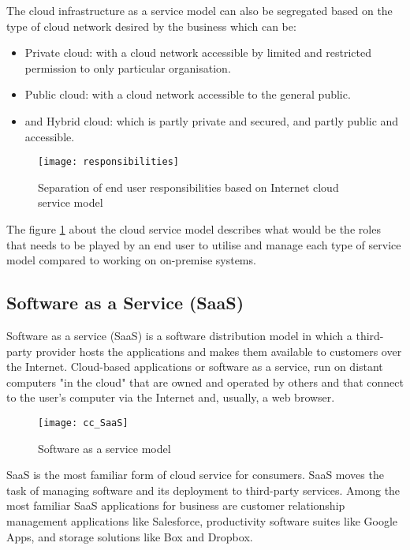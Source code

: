 The cloud infrastructure as a service model can also be segregated based on the type of cloud network desired by the business which can be:
\begin{itemize}
	\item Private cloud: with a cloud network accessible by limited and restricted permission to only particular organisation.
	\item Public cloud: with a cloud network accessible to the general public.
	\item and Hybrid cloud: which is partly private and secured, and partly public and accessible.
\end{itemize}

\begin{figure}[H]
	\begin{center}
		\texttt{[image: responsibilities]}
		\caption{Separation of end user responsibilities based on Internet cloud service model}
		\label{fig:responsibilities}
	\end{center}
	\vspace{-10pt}
\end{figure}

The figure \ref{fig:responsibilities} about the cloud service model describes what would be the roles that needs to be played by an end user to utilise and manage each type of service model compared to working on on-premise systems.

\subsection{Software as a Service (SaaS)}\label{ssec:SaaS}
Software as a service (SaaS) is a software distribution model in which a third-party provider hosts the applications and makes them available to customers over the Internet. Cloud-based applications or software as a service, run on distant computers "in the cloud" that are owned and operated by others and that connect to the user's computer via the Internet and, usually, a web browser.

\begin{figure}[H]
	\begin{center}
		\texttt{[image: cc\_SaaS]}
		\caption{Software as a service model\cite{IBMcloud:SaaS}}
		\label{fig:cc_SaaS}
	\end{center}
	\vspace{-10pt}
\end{figure}

SaaS is the most familiar form of cloud service for consumers. SaaS moves the task of managing software and its deployment to third-party services. Among the most familiar SaaS applications for business are customer relationship management applications like Salesforce, productivity software suites like Google Apps, and storage solutions like Box and Dropbox.

